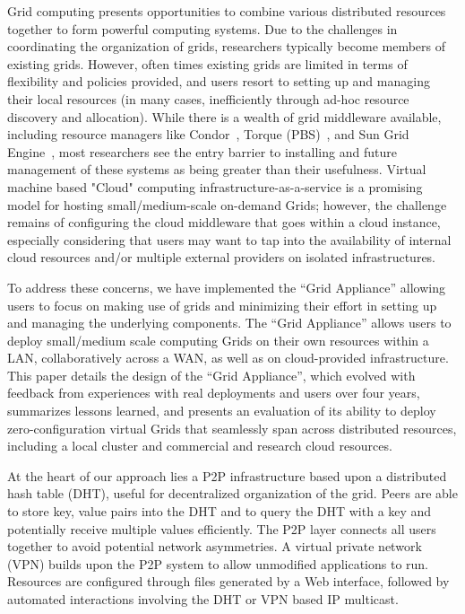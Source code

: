 \documentclass[conference]{IEEEtran}
\begin{document}
Grid computing presents opportunities to combine various distributed resources
together to form powerful computing systems.  Due to the challenges in
coordinating the organization of grids, researchers typically become members of
existing grids. However, often times existing grids are limited in terms of
flexibility and policies provided, and users resort to setting up and managing
their local resources (in many cases, inefficiently through ad-hoc resource
discovery and allocation).  While there is a wealth of grid middleware
available, including resource managers like Condor~\cite{condor0}, Torque
(PBS)~\cite{torque}, and Sun Grid Engine~\cite{grid_engine}, most researchers
see the entry barrier to installing and future management of these systems as
being greater than their usefulness.  Virtual machine based "Cloud" computing
infrastructure-as-a-service is a promising model for hosting small/medium-scale
on-demand Grids; however, the challenge remains of configuring the cloud
middleware that goes within a cloud instance, especially considering that users
may want to tap into the availability of internal cloud resources and/or
multiple external providers on isolated infrastructures. 

To address these concerns, we have implemented the ``Grid Appliance'' allowing
users to focus on making use of grids and minimizing their effort in setting up
and managing the underlying components.  The ``Grid Appliance'' allows users to
deploy small/medium scale computing Grids on their own resources within a LAN,
collaboratively across a WAN, as well as on cloud-provided infrastructure. This
paper details the design of the ``Grid Appliance'', which evolved with feedback
from experiences with real deployments and users over four years, summarizes
lessons learned, and presents an evaluation of its ability to deploy
zero-configuration virtual Grids that seamlessly span across distributed
resources, including a local cluster and commercial and research cloud
resources.

At the heart of our approach lies a P2P infrastructure based upon a distributed
hash table (DHT), useful for decentralized organization of the grid.  Peers are
able to store key, value pairs into the DHT and to query the DHT with a key and
potentially receive multiple values efficiently.  The P2P layer connects all
users together to avoid potential network asymmetries.  A virtual private
network (VPN) builds upon the P2P system to allow unmodified applications to
run.  Resources are configured through files generated by a Web interface,
followed by automated interactions involving the DHT or VPN based IP multicast.  
\end{document}
